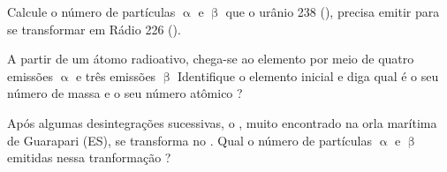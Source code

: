 \documentclass[10pt]{scrartcl}
\date{\today}
\title{}
\def\disciplina{Química}
\begin{document}
\twocolumn[

%
%
%



%

\smallbreak
\medbreak
\par\vspace{2ex}]%





\begin{exercise}
Calcule o número de partículas \(\upalpha\)  e \(\upbeta\) que o urânio 238 (), precisa emitir para se transformar em Rádio 226 ().
\end{exercise}


\begin{exercise}
A partir de um átomo radioativo, chega-se ao elemento  por meio de quatro emissões \(\upalpha\) e três emissões \(\upbeta\) Identifique o elemento inicial e diga qual é o seu número de massa e o seu número atômico ?
\end{exercise}


\begin{exercise}
Após algumas desintegrações sucessivas, o , muito encontrado na orla marítima de Guarapari (ES), se transforma no . Qual o número de partículas \(\upalpha\) e \(\upbeta\) emitidas nessa tranformação ?
\end{exercise}
\end{document}
